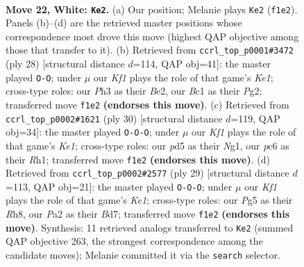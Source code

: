 \documentclass[11pt]{article}
\begin{document}
\clearpage

\begin{figure}[p]\centering
\begin{subfigure}{0.46\textwidth}\centering
\resizebox{\linewidth}{!}{%
\newchessgame
\chessboard[
  setfen={1n1qkb1r/1Q2n3/r1p3p1/p2p2P1/1p1P2Bp/7P/PPP2P2/R1BNRK2 w - - 0 22},
  showmover=false,
  pgfstyle=straightmove, color=movearrow, markmove={f1-e2}
]}
\caption{}
\end{subfigure}\hfill
\begin{subfigure}{0.46\textwidth}\centering
\resizebox{\linewidth}{!}{%
\newchessgame
\chessboard[
  setfen={1rbq1rk1/1p1p2pp/2n1pp2/p3P3/QnPP4/B4N2/4BPPP/R3K2R w KQ - 0 15},
  showmover=false,
  pgfstyle=straightmove, color=movearrow, markmove={e1-g1}
]}
\caption{}
\end{subfigure}
\\[4pt]
\begin{subfigure}{0.46\textwidth}\centering
\resizebox{\linewidth}{!}{%
\newchessgame
\chessboard[
  setfen={rn1qr1k1/pp3p2/3p1n1Q/2pP1b1p/2P3pP/2N5/PP2BPP1/R3K1NR w KQ - 1 16},
  showmover=false,
  pgfstyle=straightmove, color=movearrow, markmove={e1-c1}
]}
\caption{}
\end{subfigure}\hfill
\begin{subfigure}{0.46\textwidth}\centering
\resizebox{\linewidth}{!}{%
\newchessgame
\chessboard[
  setfen={r3k2r/1p1bbp2/p2ppp2/2q2P1p/4P2P/2N5/PPPQ2P1/1K1R1B1R b kq - 0 15},
  showmover=false,
  pgfstyle=straightmove, color=movearrow, markmove={e8-c8}
]}
\caption{}
\end{subfigure}
\caption{\textbf{Move 22, White: \texttt{Ke2}.} (a) Our position; Melanie plays \texttt{Ke2} (\texttt{f1e2}). Panels (b)--(d) are the retrieved master positions whose correspondence most drove this move (highest QAP objective among those that transfer to it). (b) Retrieved from \texttt{ccrl\_top\_p0001\#3472} (ply 28) [structural distance $d$=114, QAP obj=41]: the master played \texttt{O-O}; under $\mu$ our \emph{Kf1} plays the role of that game's \emph{Ke1}; cross-type roles: our \emph{P}h3 as their \emph{B}e2, our \emph{B}c1 as their \emph{P}g2; transferred move \texttt{f1e2} \textbf{(endorses this move)}. (c) Retrieved from \texttt{ccrl\_top\_p0002\#1621} (ply 30) [structural distance $d$=119, QAP obj=34]: the master played \texttt{O-O-O}; under $\mu$ our \emph{Kf1} plays the role of that game's \emph{Ke1}; cross-type roles: our \emph{p}d5 as their \emph{N}g1, our \emph{p}c6 as their \emph{R}h1; transferred move \texttt{f1e2} \textbf{(endorses this move)}. (d) Retrieved from \texttt{ccrl\_top\_p0002\#2577} (ply 29) [structural distance $d$=113, QAP obj=21]: the master played \texttt{O-O-O}; under $\mu$ our \emph{Kf1} plays the role of that game's \emph{Ke1}; cross-type roles: our \emph{P}g5 as their \emph{R}h8, our \emph{P}a2 as their \emph{B}d7; transferred move \texttt{f1e2} \textbf{(endorses this move)}. Synthesis: 11 retrieved analogs transferred to \texttt{Ke2} (summed QAP objective 263, the strongest correspondence among the candidate moves); Melanie committed it via the \texttt{search} selector.}
\label{fig:thought-m42}
\end{figure}
\end{document}

